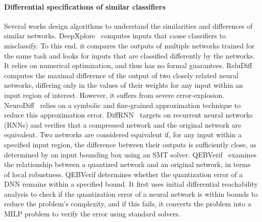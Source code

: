 \paragraph{Differential specifications of similar classifiers}
Several works design algorithms to understand the similarities and differences of similar networks.
DeepXplore~\cite{DEEPXPLORE} computes inputs that cause classifiers to misclassify. 
To this end, it compares the outputs of multiple networks trained for the same task and looks for inputs that are classified differently by the networks. It relies on numerical optimization, and thus has no formal guarantees. %
ReluDiff~\cite{RELUDIFF} computes the maximal difference of the output of two closely related neural networks, differing only in the values of their weights for any input within an input region of interest. However, it suffers from severe error-explosion. NeuroDiff~\cite{NEURODIFF} relies on a symbolic and fine-grained approximation technique to reduce this approximation error.
DiffRNN~\cite{DIFFRNN} targets on recurrent neural networks (RNNs) and verifies that a compressed network and the original network are equivalent. Two networks are considered equivalent if, for any input within a specified input region, the difference between their outputs is sufficiently close, as determined by an input bounding box using an SMT solver.
QEBVerif~\cite{QEBVERIF} examines the relationship between a quantized network and an original network, in terms of local robustness. QEBVerif determines whether the quantization error of a DNN remains within a specified bound. 
It first uses initial differential reachability analysis to check if the quantization error of a neural network is within bounds to reduce the problem's complexity, and if this fails, it converts the problem into a MILP problem to verify the error using standard solvers.  %
